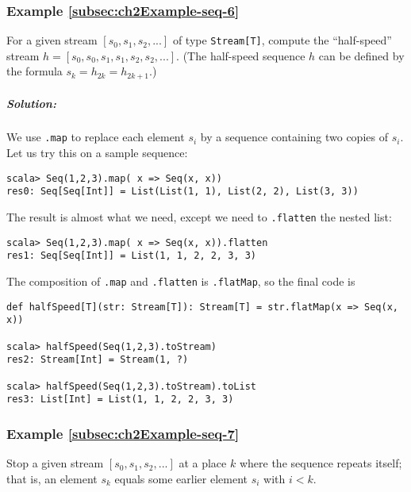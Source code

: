 \subsubsection{Example \label{subsec:ch2Example-seq-6}\ref{subsec:ch2Example-seq-6}}

For a given stream $\left[s_{0},s_{1},s_{2},...\right]$ of type \lstinline!Stream[T]!,
compute the ``half-speed'' stream $h=\left[s_{0},s_{0},s_{1},s_{1},s_{2},s_{2},...\right]$.
(The half-speed sequence $h$ can be defined by the formula $s_{k}=h_{2k}=h_{2k+1}$.)

\subparagraph{Solution:}

We use \lstinline!.map!
to replace each element $s_{i}$ by a sequence containing two copies
of $s_{i}$. Let us try this on a sample sequence:
\begin{lstlisting}
scala> Seq(1,2,3).map( x => Seq(x, x))
res0: Seq[Seq[Int]] = List(List(1, 1), List(2, 2), List(3, 3))
\end{lstlisting}
The result is almost what we need, except we need to \lstinline!.flatten!
the nested list:
\begin{lstlisting}
scala> Seq(1,2,3).map( x => Seq(x, x)).flatten
res1: Seq[Seq[Int]] = List(1, 1, 2, 2, 3, 3)
\end{lstlisting}
The composition of \lstinline!.map!
and \lstinline!.flatten!
is \lstinline!.flatMap!,
so the final code is
\begin{lstlisting}
def halfSpeed[T](str: Stream[T]): Stream[T] = str.flatMap(x => Seq(x, x))

scala> halfSpeed(Seq(1,2,3).toStream)
res2: Stream[Int] = Stream(1, ?)

scala> halfSpeed(Seq(1,2,3).toStream).toList
res3: List[Int] = List(1, 1, 2, 2, 3, 3)
\end{lstlisting}

\subsubsection{Example \label{subsec:ch2Example-seq-7}\ref{subsec:ch2Example-seq-7}}

Stop a given stream $\left[s_{0},s_{1},s_{2},...\right]$ at a place
$k$ where the sequence repeats itself; that is, an element $s_{k}$
equals some earlier element $s_{i}$ with $i<k$.

